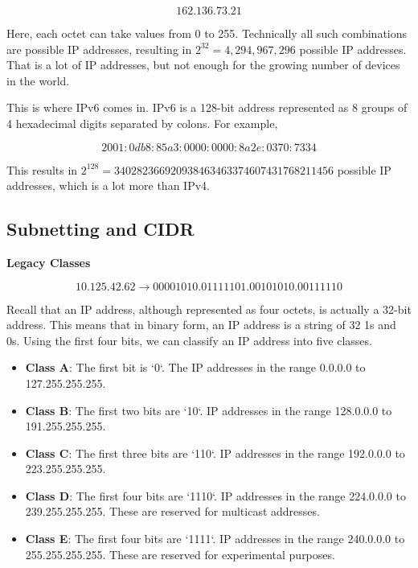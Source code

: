 \[
162.136.73.21
\]

Here, each octet can take values from 0 to 255.
Technically all such combinations are possible
IP addresses, resulting in
$2^{32} = 4,294,967,296$ possible IP addresses.
That is a lot of IP addresses, but not enough
for the growing number of devices in the world.

This is where IPv6 comes in. IPv6 is a 128-bit
address represented as 8 groups of 4 hexadecimal
digits separated by colons. For example,

\[
2001:0db8:85a3:0000:0000:8a2e:0370:7334
\]


This results in
$2^{128} = 340282366920938463463374607431768211456$
possible IP addresses, which is a lot more than
IPv4.

\subsection{Subnetting and CIDR}

\textbf{Legacy Classes}

\[
10.125.42.62 \rightarrow 0 0 0 0 1 0 1 0 . 0 1 1 1 1 1 0 1 . 0 0 1 0 1 0 1 0 . 0 0 1 1 1 1 1 0
\]

Recall that an IP address, although represented as
four octets, is actually a 32-bit address. This
means that in binary form, an IP address is a
string of 32 1s and 0s. Using the first four bits,
we can classify an IP address into five classes.

\begin{itemize}
\item \textbf{Class A}: The first bit is `0`. The
IP addresses in the range 0.0.0.0 to 127.255.255.255.
\item \textbf{Class B}: The first two bits are `10`.
IP addresses in the range 128.0.0.0 to 191.255.255.255.
\item \textbf{Class C}: The first three bits are `110`.
IP addresses in the range 192.0.0.0 to 223.255.255.255.
\item \textbf{Class D}: The first four bits are `1110`.
IP addresses in the range 224.0.0.0 to 239.255.255.255.
These are reserved for multicast addresses.
\item \textbf{Class E}: The first four bits are `1111`.
IP addresses in the range 240.0.0.0 to 255.255.255.255.
These are reserved for experimental purposes.
\end{itemize}

